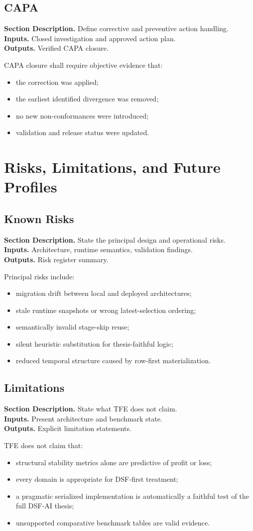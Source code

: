 \documentclass[11pt]{report}
\newcommand{\meta}[3]{\textbf{Section Description.} #1\\
\textbf{Inputs.} #2\\
\textbf{Outputs.} #3\par}
\begin{document}
\section{CAPA}
\meta{Define corrective and preventive action handling.}{Closed investigation and approved action plan.}{Verified CAPA closure.}

CAPA closure shall require objective evidence that:
\begin{itemize}
    \item the correction was applied;
    \item the earliest identified divergence was removed;
    \item no new non-conformances were introduced;
    \item validation and release status were updated.
\end{itemize}

\chapter{Risks, Limitations, and Future Profiles}
\section{Known Risks}
\meta{State the principal design and operational risks.}{Architecture, runtime semantics, validation findings.}{Risk register summary.}

Principal risks include:
\begin{itemize}
    \item migration drift between local and deployed architectures;
    \item stale runtime snapshots or wrong latest-selection ordering;
    \item semantically invalid stage-skip reuse;
    \item silent heuristic substitution for thesis-faithful logic;
    \item reduced temporal structure caused by row-first materialization.
\end{itemize}

\section{Limitations}
\meta{State what TFE does not claim.}{Present architecture and benchmark state.}{Explicit limitation statements.}

TFE does not claim that:
\begin{itemize}
    \item structural stability metrics alone are predictive of profit or loss;
    \item every domain is appropriate for DSF-first treatment;
    \item a pragmatic serialized implementation is automatically a faithful test of the full DSF-AI thesis;
    \item unsupported comparative benchmark tables are valid evidence.
\end{itemize}
\end{document}
